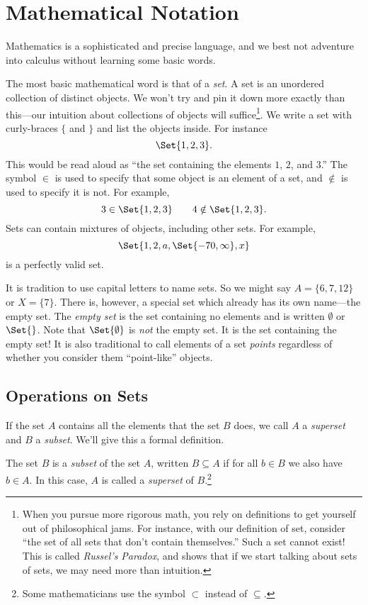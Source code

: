 \section{Mathematical Notation}
	Mathematics is a sophisticated and precise language, and
	we best not adventure into calculus without learning some
	basic words.

	The most basic mathematical word is that of a \emph{set}.  
	A set is an unordered collection of distinct objects.  We won't try and pin
	it down more exactly than this---our intuition about collections
	of objects will suffice\footnote{ When you pursue more rigorous math,
	you rely on definitions to get yourself out of philosophical jams.  For instance,
	with our definition of set, consider ``the set of all sets that don't
	contain themselves.''  Such a set cannot exist!
	This is called \emph{Russel's Paradox}, and shows
	that if we start talking about sets of sets, we may need more than
	intuition.}. We write a set with curly-braces $\{$ and $\}$ and
	list the objects inside.  For instance
	\[
		\Set{1,2,3}.
	\]
	This would be read aloud as ``the set containing the elements $1$, $2$, and $3$.''
	The symbol $\in$\index{$\in$} is used to specify that some object is an element of a set, and
	$\notin$ is used to specify it is not.  For example,
	\[
		3\in\Set{1,2,3}\qquad 4\notin\Set{1,2,3}.
	\]
	Sets can contain mixtures of objects, including other sets.  For example,
	\[
		\Set{1,2,a,\Set{-70,\infty}, x}
	\]
	is a perfectly valid set.

	It is tradition to use capital letters to name sets.  So we might say $A=\{6,7,12\}$
	or $X=\{7\}$.  There is, however, a special set which already has its own name---the
	empty set.  The \emph{empty set} is the set containing no elements
	and is written $\emptyset$ or $\Set{}$.  Note that $\Set{\emptyset}$ is \emph{not}
	the empty set.  It is the set containing the empty set!  It is also traditional
	to call elements of a set \emph{points} regardless of whether you
	consider them ``point-like'' objects.

	\subsection{Operations on Sets}
	If the set $A$ contains all the elements that the set $B$ does, we call $A$ a \emph{superset}
	and $B$ a \emph{subset}.  We'll give this a formal
	definition.
	\begin{definition}
		The set $B$ is a \emph{subset} of the set $A$, written $B\subseteq A$ if for all
		$b\in B$ we also have $b\in A$.  In this case, $A$ is called a \emph{superset}
		of $B$.\footnote{
			Some mathematicians use the symbol $\subset$ instead of $\subseteq$.}
	\end{definition}

